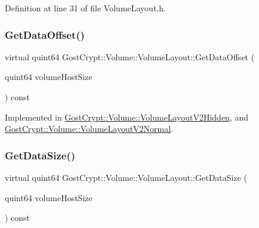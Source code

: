Definition at line 31 of file Volume\+Layout.\+h.

\mbox{\label{class_gost_crypt_1_1_volume_1_1_volume_layout_a967b9498adca758a2c721bdfb102e9a9}} 
\subsubsection{\texorpdfstring{Get\+Data\+Offset()}{GetDataOffset()}}
{\footnotesize\ttfamily virtual quint64 Gost\+Crypt\+::\+Volume\+::\+Volume\+Layout\+::\+Get\+Data\+Offset (\begin{DoxyParamCaption}\item[{quint64}]{volume\+Host\+Size }\end{DoxyParamCaption}) const\hspace{0.3cm}{\ttfamily [pure virtual]}}



Implemented in \hyperlink{class_gost_crypt_1_1_volume_1_1_volume_layout_v2_hidden_aa03f496e4a734339f50a804ad7d0d3cf}{Gost\+Crypt\+::\+Volume\+::\+Volume\+Layout\+V2\+Hidden}, and \hyperlink{class_gost_crypt_1_1_volume_1_1_volume_layout_v2_normal_a6529ff8777f6e31f412dee79102d11b5}{Gost\+Crypt\+::\+Volume\+::\+Volume\+Layout\+V2\+Normal}.

\mbox{\label{class_gost_crypt_1_1_volume_1_1_volume_layout_ac0ead260317df3a9fd15518dc56a7d62}} 
\subsubsection{\texorpdfstring{Get\+Data\+Size()}{GetDataSize()}}
{\footnotesize\ttfamily virtual quint64 Gost\+Crypt\+::\+Volume\+::\+Volume\+Layout\+::\+Get\+Data\+Size (\begin{DoxyParamCaption}\item[{quint64}]{volume\+Host\+Size }\end{DoxyParamCaption}) const\hspace{0.3cm}{\ttfamily [pure virtual]}}



